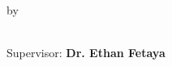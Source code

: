 \begin{titlepage}
\begin{center}










        by
        
        \bigskip

        \makeatletter
        {\Large\titlefont\bfseries\@firstnames\ {\Large\titlefont\bfseries\@lastname}} \\
        \bigskip
        Supervisor: 
        {\Large\titlefont\bfseries Dr. Ethan  {\Large\titlefont\bfseries Fetaya}}
        \makeatother

        \bigskip
        \bigskip



        \vspace*{2\bigskipamount}

    \end{center}




\end{titlepage}
